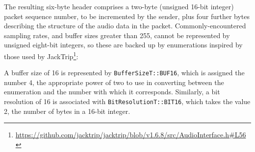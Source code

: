 The resulting six-byte header comprises a two-byte (unsigned 16-bit integer)
packet sequence number, to be incremented by the sender, plus four further bytes
describing the structure of the audio data in the packet.
Commonly-encountered sampling rates, and buffer sizes greater than 255, cannot
be represented by unsigned eight-bit integers, so
these are backed up by enumerations inspired by those used by JackTrip\footnote{
    \url{https://github.com/jacktrip/jacktrip/blob/v1.6.8/src/AudioInterface.h\#L56}
}:

\noindent
A buffer size of 16 is represented by \texttt{BufferSizeT::BUF16},
which is assigned the number 4, the appropriate power of two to use in
converting between the enumeration and the number with which it corresponds.
Similarly, a bit resolution of 16 is associated with
\texttt{BitResolutionT::BIT16}, which takes the value 2, the number of
bytes in a 16-bit integer.

